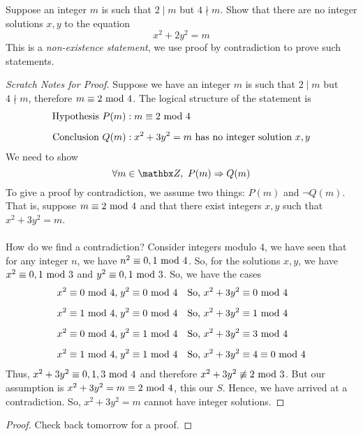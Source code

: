 \begin{example}
Suppose an integer $m$ is such that $2\mid m$ but $4\nmid m$. Show that there are no integer solutions $x,y$ to the equation
\[x^2 + 2y^2 = m\]
This is a \emph{non-existence statement}, we use proof by contradiction to prove such statements.
\end{example}
\begin{proof}[Scratch Notes for Proof]\renewcommand{\qed}{}
Suppose we have an integer $m$ is such that $2\mid m$ but $4\nmid m$, therefore $m \equiv 2\text{ mod }{4}$. The logical structure of the statement is
\begin{align*}
\text{Hypothesis } & P(m): m \equiv 2 \text{ mod }{4}\\[0.5em]
\text{Conclusion } & Q(m): x^2 + 3y^2 = m \text{ has no integer solution }x,y
\end{align*}
We need to show \[\forall m \in \zz,\ P(m) \implies Q(m)\]
To give a proof by contradiction, we assume two things: $P(m)$ and $\neg Q(m)$. That is, suppose $m \equiv 2\text{ mod }{4}$ and that there exist integers $x,y$ such that $x^2 + 3y^2 = m$.\\
\\
How do we find a contradiction? Consider integers modulo $4$, we have seen that for any integer $n$, we have $n^2 \equiv 0,1\text{ mod }{4}$. So, for the solutions $x,y$, we have $x^2 \equiv 0,1\text{ mod }{3}$ and $y^2 \equiv 0,1\text{ mod }{3}$. So, we have the cases
\begin{align*}
x^2 \equiv 0 \text{ mod }{4},&\; y^2 \equiv 0 \text{ mod }{4} & \text{So, } x^2 + 3y^2 &\equiv 0 \text{ mod }{4}\\[0.5em]
x^2 \equiv 1 \text{ mod }{4},&\; y^2 \equiv 0 \text{ mod }{4} & \text{So, } x^2 + 3y^2 &\equiv 1 \text{ mod }{4}\\[0.5em]
x^2 \equiv 0 \text{ mod }{4},&\; y^2 \equiv 1 \text{ mod }{4} & \text{So, } x^2 + 3y^2 &\equiv 3 \text{ mod }{4}\\[0.5em]
x^2 \equiv 1 \text{ mod }{4},&\; y^2 \equiv 1 \text{ mod }{4} & \text{So, } x^2 + 3y^2 &\equiv 4 \equiv 0 \text{ mod }{4}
\end{align*}
Thus, $x^2 + 3y^2 \equiv 0,1,3 \text{ mod }{4}$ and therefore $x^2 + 3y^2 \not\equiv 2 \text{ mod }{3}$. But our assumption is $x^2 + 3y^2 = m \equiv 2 \text{ mod }{4}$, this our $S$. Hence, we have arrived at a contradiction. So, $x^2 + 3y^2 = m$ cannot have integer solutions. 
\end{proof}
\begin{proof}
Check back tomorrow for a proof.
\end{proof}


